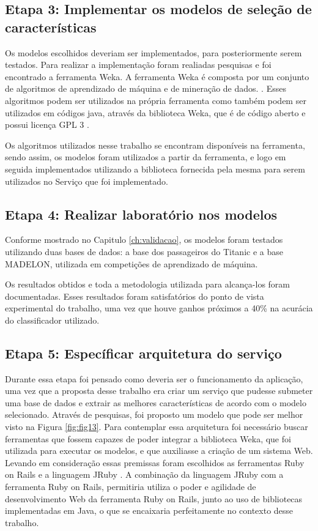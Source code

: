 \subsection{Etapa 3: Implementar os modelos de seleção de características}

Os modelos escolhidos deveriam ser implementados, para posteriormente serem testados. Para realizar a implementação foram realiadas pesquisas e foi encontrado a ferramenta Weka. A ferramenta Weka é composta por um conjunto de algoritmos de aprendizado de máquina e de mineração de dados. \cite{weka_2005}. Esses algoritmos podem ser utilizados na própria ferramenta como também podem ser utilizados em códigos java, através da biblioteca Weka, que é de código aberto e possui licença GPL 3 \cite{gpl_2007}.

Os algoritmos utilizados nesse trabalho se encontram disponíveis na ferramenta, sendo assim, os modelos foram utilizados a partir da ferramenta, e logo em seguida implementados utilizando a biblioteca fornecida pela mesma para serem utilizados no Serviço que foi implementado.

\subsection{Etapa 4: Realizar laboratório nos modelos}

Conforme mostrado no Capitulo \ref{ch:validacao}, os modelos foram testados utilizando duas bases de dados: a base dos passageiros do Titanic e a base MADELON, utilizada em competições de aprendizado de máquina. 

Os resultados obtidos e toda a metodologia utilizada para alcança-los foram documentadas. Esses resultados foram satisfatórios do ponto de vista experimental do trabalho, uma vez que houve ganhos próximos a 40\% na acurácia do classificador utilizado.

\subsection{Etapa 5: Específicar arquitetura do serviço}

Durante essa etapa foi pensado como deveria ser o funcionamento da aplicação, uma vez que a proposta desse trabalho era criar um serviço que pudesse submeter uma base de dados e extrair as melhores características de acordo com o modelo selecionado. Através de pesquisas, foi proposto um modelo que pode ser melhor visto na Figura \ref{fig:fig13}. Para contemplar essa arquitetura foi necessário buscar ferramentas que fossem capazes de poder integrar a biblioteca Weka, que foi utilizada para executar os modelos, e que auxiliasse a criação de um sistema Web. Levando em consideração essas premissas foram escolhidos as ferramentas Ruby on Rails \cite{ror} e a linguagem JRuby \cite{jruby}. A combinação da linguagem JRuby com a ferramenta Ruby on Rails, permitiria utiliza o poder e agilidade de desenvolvimento Web da ferramenta Ruby on Rails, junto ao uso de bibliotecas implementadas em Java, o que se encaixaria perfeitamente no contexto desse trabalho.

